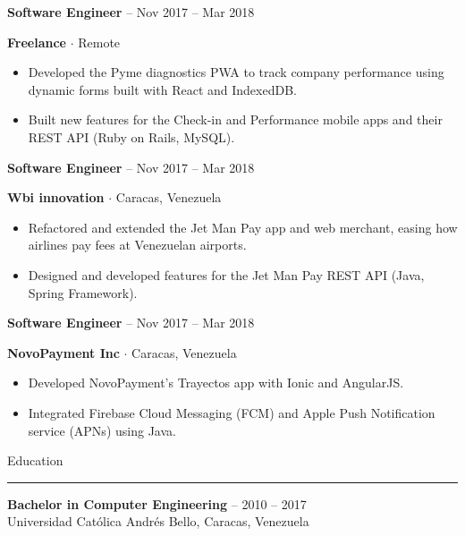 \documentclass[10pt,a4paper]{article}
\renewcommand{\section}[1]{%
  \vspace{7pt}%
  {\fontsize{14}{16}\selectfont\color{heading}#1}\par
  \vspace{-4pt}\rule{\linewidth}{0.6pt}\par\vspace{3pt}}
\newcommand{\job}[4]{%
  \vspace{5pt}%
  \textbf{#1} -- #2\par
  \textbf{#3} $\cdot$ #4\par}
\begin{document}
\begin{minipage}[t]{0.71\textwidth}
\job{Software Engineer}{Nov 2017 -- Mar 2018}{Freelance}{Remote}
\begin{itemize}
  \item Developed the Pyme diagnostics PWA to track company performance using dynamic forms
        built with React and IndexedDB.
  \item Built new features for the Check-in and Performance mobile apps and their REST API
        (Ruby on Rails, MySQL).
\end{itemize}

\job{Software Engineer}{Nov 2017 -- Mar 2018}{Wbi innovation}{Caracas, Venezuela}
\begin{itemize}
  \item Refactored and extended the Jet Man Pay app and web merchant, easing how airlines pay fees
        at Venezuelan airports.
  \item Designed and developed features for the Jet Man Pay REST API (Java, Spring Framework).
\end{itemize}

\job{Software Engineer}{Nov 2017 -- Mar 2018}{NovoPayment Inc}{Caracas, Venezuela}
\begin{itemize}
  \item Developed NovoPayment's Trayectos app with Ionic and AngularJS.
  \item Integrated Firebase Cloud Messaging (FCM) and Apple Push Notification service (APNs) using Java.
\end{itemize}

\section{Education}
\textbf{Bachelor in Computer Engineering} -- 2010 -- 2017\\
Universidad Católica Andrés Bello, Caracas, Venezuela
\end{minipage}
\end{document}
